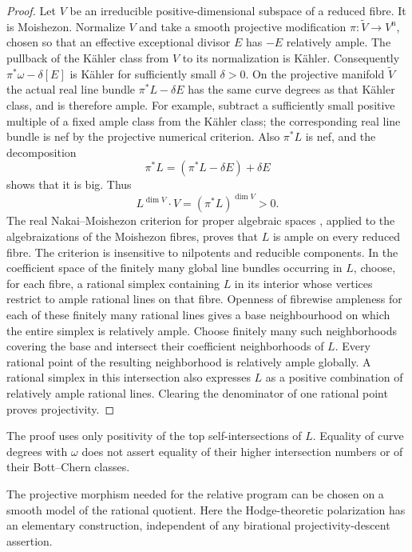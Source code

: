 \begin{proof}
Let $V$ be an irreducible positive-dimensional subspace of a reduced
fibre. It is Moishezon. Normalize $V$ and take a smooth projective
modification $\pi:\widetilde V\to V^{\mathrm n}$, chosen so that
an effective exceptional divisor $E$ has $-E$ relatively ample.
The pullback of the K\"ahler class from $V$ to its normalization is
K\"ahler. Consequently
$\pi^*\omega-\delta[E]$ is K\"ahler for sufficiently small
$\delta>0$. On the projective manifold $\widetilde V$ the actual
real line bundle $\pi^*L-\delta E$ has the same curve degrees as
that K\"ahler class, and is therefore ample. For example, subtract
a sufficiently small positive multiple of a fixed ample class from
the K\"ahler class; the corresponding real line bundle is nef by
the projective numerical criterion. Also $\pi^*L$ is nef, and the
decomposition
\[
 \pi^*L=(\pi^*L-\delta E)+\delta E
\]
shows that it is big. Thus
\[
 L^{\dim V}\cdot V=(\pi^*L)^{\dim V}>0.
\]
The real Nakai--Moishezon criterion for proper algebraic spaces
\cite[Theorem~1.6]{FujinoMiyamoto2020}, applied to the algebraizations
of the Moishezon fibres, proves that $L$ is ample on every reduced
fibre. The criterion is insensitive to nilpotents and reducible
components. In the coefficient space of the finitely many global
line bundles occurring in $L$, choose, for each fibre, a rational
simplex containing $L$ in its interior whose vertices restrict to
ample rational lines on that fibre. Openness of fibrewise ampleness
for each of these finitely many rational lines gives a base
neighbourhood on which the entire simplex is relatively ample.
Choose finitely many such neighborhoods covering the base and
intersect their coefficient neighborhoods of $L$. Every rational
point of the resulting neighborhood is relatively ample globally.
A rational simplex in this intersection also expresses $L$ as a
positive combination of relatively ample rational lines. Clearing
the denominator of one rational point proves projectivity.
\end{proof}

\begin{remark}
The proof uses only positivity of the top self-intersections of
$L$. Equality of curve degrees with $\omega$ does not assert
equality of their higher intersection numbers or of their
Bott--Chern classes.
\end{remark}




The projective morphism needed for the relative program can be chosen
on a smooth model of the rational quotient. Here the Hodge-theoretic
polarization has an elementary construction, independent of any
birational projectivity-descent assertion.

